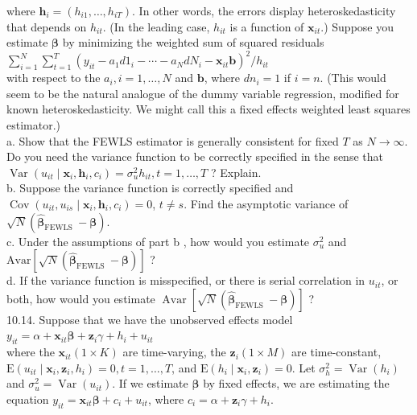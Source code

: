 \documentclass[10pt]{article}
\begin{document}
where $\mathbf{h}_{i}=\left(h_{i 1}, \ldots, h_{i T}\right)$. In other words, the errors display heteroskedasticity that depends on $h_{i t}$. (In the leading case, $h_{i t}$ is a function of $\mathbf{x}_{i t}$.) Suppose you estimate $\boldsymbol{\beta}$ by minimizing the weighted sum of squared residuals\\
$\sum_{i=1}^{N} \sum_{t=1}^{T}\left(y_{i t}-a_{1} d 1_{i}-\cdots-a_{N} d N_{i}-\mathbf{x}_{i t} \mathbf{b}\right)^{2} / h_{i t}$\\
with respect to the $a_{i}, i=1, \ldots, N$ and $\mathbf{b}$, where $d n_{i}=1$ if $i=n$. (This would seem to be the natural analogue of the dummy variable regression, modified for known heteroskedasticity. We might call this a fixed effects weighted least squares estimator.)\\
a. Show that the FEWLS estimator is generally consistent for fixed $T$ as $N \rightarrow \infty$. Do you need the variance function to be correctly specified in the sense that $\operatorname{Var}\left(u_{i t} \mid \mathbf{x}_{i}, \mathbf{h}_{i}, c_{i}\right)=\sigma_{u}^{2} h_{i t}, t=1, \ldots, T$ ? Explain.\\
b. Suppose the variance function is correctly specified and $\operatorname{Cov}\left(u_{i t}, u_{i s} \mid \mathbf{x}_{i}, \mathbf{h}_{i}, c_{i}\right)=0$, $t \neq s$. Find the asymptotic variance of $\sqrt{N}\left(\hat{\boldsymbol{\beta}}_{\text {FEWLS }}-\boldsymbol{\beta}\right)$.\\
c. Under the assumptions of part b , how would you estimate $\sigma_{u}^{2}$ and $\mathrm{Avar}\left[\sqrt{N}\left(\hat{\boldsymbol{\beta}}_{\text {FEWLS }}-\boldsymbol{\beta}\right)\right]$ ?\\
d. If the variance function is misspecified, or there is serial correlation in $u_{i t}$, or both, how would you estimate $\operatorname{Avar}\left[\sqrt{N}\left(\hat{\boldsymbol{\beta}}_{\text {FEWLS }}-\boldsymbol{\beta}\right)\right]$ ?\\
10.14. Suppose that we have the unobserved effects model\\
$y_{i t}=\alpha+\mathbf{x}_{i t} \boldsymbol{\beta}+\mathbf{z}_{i} \gamma+h_{i}+u_{i t}$\\
where the $\mathbf{x}_{i t}(1 \times K)$ are time-varying, the $\mathbf{z}_{i}(1 \times M)$ are time-constant, $\mathrm{E}\left(u_{i t} \mid \mathbf{x}_{i}, \mathbf{z}_{i}, h_{i}\right)=0, t=1, \ldots, T$, and $\mathrm{E}\left(h_{i} \mid \mathbf{x}_{i}, \mathbf{z}_{i}\right)=0$. Let $\sigma_{h}^{2}=\operatorname{Var}\left(h_{i}\right)$ and $\sigma_{u}^{2}= \operatorname{Var}\left(u_{i t}\right)$. If we estimate $\boldsymbol{\beta}$ by fixed effects, we are estimating the equation $y_{i t}=\mathbf{x}_{i t} \boldsymbol{\beta}+c_{i}+u_{i t}$, where $c_{i}=\alpha+\mathbf{z}_{i} \gamma+h_{i}$.\\
\end{document}
